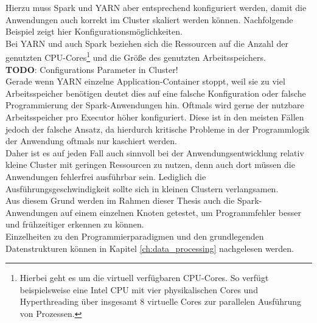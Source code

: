 \noindent
Hierzu muss Spark und YARN aber entsprechend konfiguriert werden, damit die Anwendungen auch korrekt im Cluster skaliert werden können. Nachfolgende Beispiel zeigt hier Konfigurationsmöglichkeiten.\\
Bei YARN und auch Spark beziehen sich die Ressourcen auf die Anzahl der genutzten CPU-Cores\footnote{Hierbei geht es um die virtuell verfügbaren CPU-Cores. So verfügt beispielsweise eine Intel CPU mit vier physikalischen Cores und Hyperthreading über insgesamt 8 virtuelle Cores zur parallelen Ausführung von Prozessen.} und die Größe des genutzten Arbeitsspeichers.\\

\noindent
\textbf{TODO}: Configurations Parameter in Cluster!\\

\noindent
Gerade wenn YARN einzelne Application-Container stoppt, weil sie zu viel Arbeitsspeicher benötigen deutet dies auf eine falsche Konfiguration oder falsche Programmierung der Spark-Anwendungen hin. Oftmals wird gerne der nutzbare Arbeitsspeicher pro Executor höher konfiguriert. Diese ist in den meisten Fällen jedoch der falsche Ansatz, da hierdurch kritische Probleme in der Programmlogik der Anwendung oftmals  nur kaschiert werden.\\ Daher ist es auf jeden Fall auch sinnvoll bei der Anwendungsentwicklung relativ kleine Cluster mit geringen Ressourcen zu nutzen, denn auch dort müssen die Anwendungen fehlerfrei ausführbar sein. Lediglich die Ausführungsgeschwindigkeit sollte sich in kleinen Clustern verlangsamen.\\ 
Aus diesem Grund werden im Rahmen dieser Thesis auch die Spark-Anwendungen auf einem einzelnen Knoten getestet, um Programmfehler besser und frühzeitiger erkennen zu können.\\
Einzelheiten zu den Programmierparadigmen und den grundlegenden Datenstrukturen können
in Kapitel \ref{ch:data_processing} nachgelesen werden.


